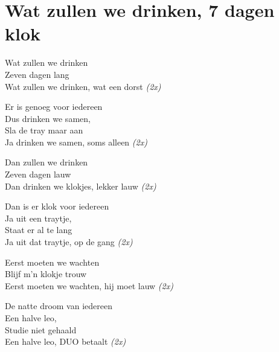 \section{Wat zullen we drinken, 7 dagen klok}
Wat zullen we drinken\\
Zeven dagen lang\\
Wat zullen we drinken, wat een dorst \textit{(2x)}

Er is genoeg voor iedereen\\
Dus drinken we samen,\\
Sla de tray maar aan\\
Ja drinken we samen, soms alleen \textit{(2x)}

Dan zullen we drinken\\
Zeven dagen lauw\\
Dan drinken we klokjes, lekker lauw \textit{(2x)}

Dan is er klok voor iedereen\\
Ja uit een traytje,\\
Staat er al te lang\\
Ja uit dat traytje, op de gang \textit{(2x)}

Eerst moeten we wachten\\
Blijf m'n klokje trouw\\
Eerst moeten we wachten, hij moet lauw \textit{(2x)}

De natte droom van iedereen\\
Een halve leo,\\
Studie niet gehaald\\
Een halve leo, DUO betaalt \textit{(2x)}
